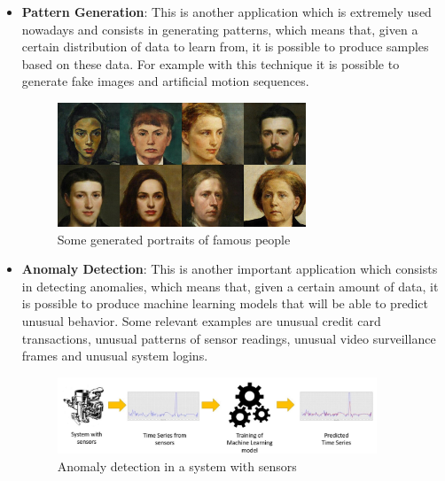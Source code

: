 \begin{itemize}
          \newpage
    \item \textbf{Pattern Generation}: This is another application which is extremely used nowadays and consists in generating patterns, which means that, given a certain distribution of data to learn from, it is possible to produce samples based on these data. For example with this technique it is possible to generate fake images and artificial motion sequences.
          \vspace{10mm}

          \begin{figure}[h]
              \centering
              \includegraphics[width=0.7\textwidth]{../img/Fake_img}
              \caption{Some generated portraits of famous people}
          \end{figure}

          \vspace{10mm}
    \item \textbf{Anomaly Detection}: This is another important application which consists in detecting anomalies, which means that, given a certain amount of data, it is possible to produce machine learning models that will be able to predict unusual behavior. Some relevant examples are unusual credit card transactions, unusual patterns of sensor readings, unusual video surveillance frames and unusual system logins.
          \vspace{10mm}

          \begin{figure}[h]
              \centering
              \includegraphics[width=0.9\textwidth]{../img/Anomaly_detect}
              \caption{Anomaly detection in a system with sensors}
          \end{figure}


\end{itemize}
